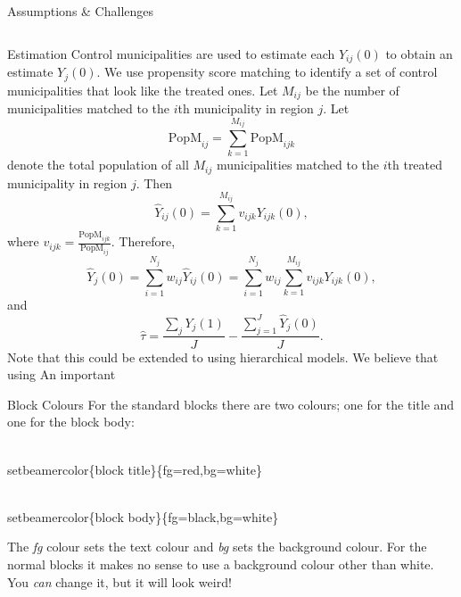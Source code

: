 \documentclass[final]{beamer}
\newlength{\onecolwid}
\newlength{\threecolwid}
\begin{document}
\begin{frame}[t]
\begin{columns}[t]
\begin{column}{\threecolwid}
\begin{block}{Assumptions \& Challenges}
	 \end{block}
      \begin{columns}[t,totalwidth=\threecolwid]	%
        \begin{column}{\onecolwid}
			      \begin{block}{Estimation}
					Control municipalities are used to estimate each $Y_{ij}(0)$ to obtain an estimate $Y_j(0)$. We use propensity score matching to identify a set of control municipalities that look like the treated ones.
					Let $M_{ij}$ be the number of municipalities matched to the $i$th municipality in region $j$. Let $$\textrm{PopM}_{ij}=\sum_{k=1}^{M_{ij}}\textrm{PopM}_{ijk}$$ denote the total population of all $M_{ij}$ municipalities matched to the $i$th treated municipality in region $j$. Then 
					$$\hat{Y}_{ij}(0) =\sum_{k=1}^{M_{ij}}v_{ijk}Y_{ijk}(0),$$ where $v_{ijk}=\frac{\textrm{PopM}_{ijk}}{\textrm{PopM}_{ij}}.$
					Therefore,
					$$\hat{Y}_{j}(0) =\sum_{i=1}^{N_j}w_{ij}\hat{Y}_{ij}(0)=\sum_{i=1}^{N_j}w_{ij}\sum_{k=1}^{M_{ij}}v_{ijk}Y_{ijk}(0),$$
					and
					$$\hat{\tau}=\frac{\sum_j Y_j(1)}{J}-\frac{\sum_{j=1}^{J}\hat{Y}_j(0)}{J}.$$
			Note that this could be extended to using hierarchical models. We believe that using 
			An important 	
			      \end{block}
          \begin{block}{Block Colours}
            For the standard blocks there are two colours; one for the title and one for the block body:\\
            \begin{semiverbatim}
              {\color{red}\\setbeamercolor}\{block title\}\newline \{fg=red,bg=white\}
            \end{semiverbatim}
            \begin{semiverbatim}
              {\color{red}\\setbeamercolor}\{block  body\}\newline \{fg=black,bg=white\}
            \end{semiverbatim}
            The \emph{fg} colour sets the text colour and \emph{bg} sets the background colour.
            For the normal blocks it makes no sense to use a background colour other than white. You \emph{can} change it, but it will look weird!
          \end{block}

\end{column}
\end{columns}
\end{column}
\end{columns}
\end{frame}
\end{document}
